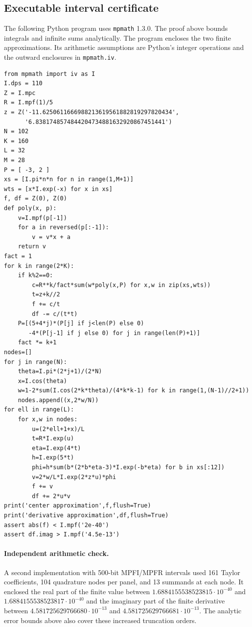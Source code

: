 \documentclass[11pt,a4paper]{article}
\begin{document}
\subsection*{Executable interval certificate}
The following Python program uses \texttt{mpmath} 1.3.0. The proof
above bounds integrals and infinite sums analytically. The program
encloses the two finite approximations. Its arithmetic assumptions
are Python's integer operations and the outward enclosures in
\texttt{mpmath.iv}.
{\footnotesize
\begin{verbatim}
from mpmath import iv as I
I.dps = 110
Z = I.mpc
R = I.mpf(1)/5
z = Z('-11.6250611666988213619561882819297820434',
      '6.8381748574844204734881632920867451441')
N = 102
K = 160
L = 32
M = 28
P = [ -3, 2 ]
xs = [I.pi*n*n for n in range(1,M+1)]
wts = [x*I.exp(-x) for x in xs]
f, df = Z(0), Z(0)
def poly(x, p):
    v=I.mpf(p[-1])
    for a in reversed(p[:-1]):
        v = v*x + a
    return v
fact = 1
for k in range(2*K):
    if k%2==0:
        c=R**k/fact*sum(w*poly(x,P) for x,w in zip(xs,wts))
        t=z+k//2
        f += c/t
        df -= c/(t*t)
    P=[(5+4*j)*(P[j] if j<len(P) else 0)
       -4*(P[j-1] if j else 0) for j in range(len(P)+1)]
    fact *= k+1
nodes=[]
for j in range(N):
    theta=I.pi*(2*j+1)/(2*N)
    x=I.cos(theta)
    w=1-2*sum(I.cos(2*k*theta)/(4*k*k-1) for k in range(1,(N-1)//2+1))
    nodes.append((x,2*w/N))
for ell in range(L):
    for x,w in nodes:
        u=(2*ell+1+x)/L
        t=R*I.exp(u)
        eta=I.exp(4*t)
        h=I.exp(5*t)
        phi=h*sum(b*(2*b*eta-3)*I.exp(-b*eta) for b in xs[:12])
        v=2*w/L*I.exp(2*z*u)*phi
        f += v
        df += 2*u*v
print('center approximation',f,flush=True)
print('derivative approximation',df,flush=True)
assert abs(f) < I.mpf('2e-40')
assert df.imag > I.mpf('4.5e-13')
\end{verbatim}
}
\paragraph{Independent arithmetic check.}
A second implementation with 500-bit MPFI/MPFR intervals used 161
Taylor coefficients, 104 quadrature nodes per panel, and 13 summands at each
node. It enclosed the real part of the finite value between
$1.6884155538523815\cdot10^{-40}$ and
$1.6884155538523817\cdot10^{-40}$ and the imaginary part of the
finite derivative between $4.581725629766680\cdot10^{-13}$ and
$4.581725629766681\cdot10^{-13}$. The analytic error bounds above
also cover these increased truncation orders.
\end{document}
